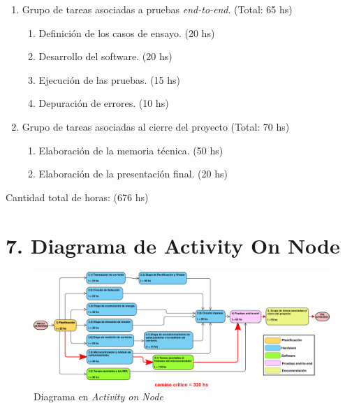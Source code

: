\documentclass[11pt]{charter}
\begin{document}
\begin{enumerate}
	\item Grupo de tareas asociadas a pruebas \textit{end-to-end}. (Total: 65 hs)
		\begin{enumerate}
		 	\item Definición de los casos de ensayo. (20 hs)
		 	\item Desarrollo del software. (20 hs)
		 	\item Ejecución de las pruebas. (15 hs)
		 	\item Depuración de errores. (10 hs)
		\end{enumerate}		

	\item Grupo de tareas asociadas al cierre del proyecto (Total: 70 hs)
		\begin{enumerate}
			\item Elaboración de la memoria técnica. (50 hs)
			\item Elaboración de la presentación final. (20 hs)
		\end{enumerate}
	\end{enumerate}
	
Cantidad total de horas: (676 hs)


\section{7. Diagrama de Activity On Node}
\label{sec:AoN}
\begin{figure}[H]
	\centering 
	\includegraphics[width=\textwidth]{./Figuras/activity_on_node/version_compacta/aon.png}
	\caption{Diagrama en \textit{Activity on Node}}
	\label{fig:AoN}
\end{figure}
\end{document}
